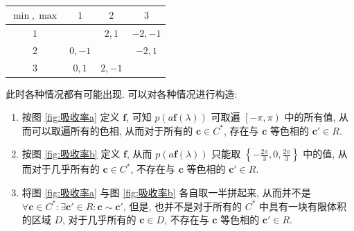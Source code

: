 \documentclass{article}
\begin{document}
\begin{table}[h!]
	\centering
	\caption{}
	\label{tab:be}
	\begin{tabular}{c|ccc}
		$\min,\max$&$1$&$2$&$3$\\
		\hline
		$1$&&$2,1$&$-2,-1$\\
		$2$&$0,-1$&&$-2,1$\\
		$3$&$0,1$&$2,-1$&
	\end{tabular}
\end{table}

此时各种情况都有可能出现.
可以对各种情况进行构造:
\begin{enumerate}
	\item
	按图 \ref{fig:吸收率a} 定义 $\mathbf f$,
	可知 $p\!\left(a\mathbf f\!\left(\lambda\right)\right)$
	可取遍 $\left[-\pi,\pi\right)$ 中的所有值,
	从而可以取遍所有的色相,
	从而对于所有的 $\mathbf c\in C^*$,
	存在与 $\mathbf c$ 等色相的 $\mathbf c'\in R$.

	\item
	按图 \ref{fig:吸收率b} 定义 $\mathbf f$,
	从而 $p\!\left(a\mathbf f\!\left(\lambda\right)\right)$
	只能取 $\left\{-\frac{2\pi}3,0,\frac{2\pi}3\right\}$ 中的值,
	从而对于几乎所有的 $\mathbf c\in C^*$,
	不存在与 $\mathbf c$ 等色相的 $\mathbf c'\in R$.

	\item
	将图 \ref{fig:吸收率a} 与图 \ref{fig:吸收率b} 各自取一半拼起来,
	从而并不是 $\forall\mathbf c\in C^*:\exists\mathbf c'\in R:\mathbf c\sim\mathbf c'$,
	但是, 也并不是对于所有的 $C^*$ 中具有一块有限体积的区域 $D$,
	对于几乎所有的 $\mathbf c\in D$,
	不存在与 $\mathbf c$ 等色相的 $\mathbf c'\in R$.
\end{enumerate}
\end{document}
